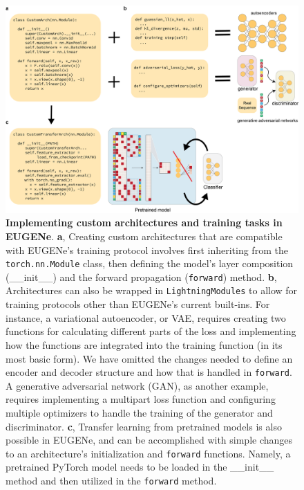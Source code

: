 \begin{figure}[p]
    \centering
    \includegraphics[width=\textwidth]{1_figures-and-files/suppfigure5.png}
    \caption[Custom model development in EUGENe]{\textbf{Implementing custom architectures and training tasks in EUGENe}. \textbf{a}, Creating custom architectures that are compatible with EUGENe’s training protocol involves first inheriting from the \texttt{torch.nn.Module} class, then defining the model’s layer composition (\_\_init\_\_) and the forward propagation (\texttt{forward}) method. \textbf{b}, Architectures can also be wrapped in \texttt{LightningModules} to allow for training protocols other than EUGENe’s current built-ins. For instance, a variational autoencoder, or VAE, requires creating two functions for calculating different parts of the loss and implementing how the functions are integrated into the training function (in its most basic form). We have omitted the changes needed to define an encoder and decoder structure and how that is handled in \texttt{forward}. A generative adversarial network (GAN), as another example, requires implementing a multipart loss function and configuring multiple optimizers to handle the training of the generator and discriminator. \textbf{c}, Transfer learning from pretrained models is also possible in EUGENe, and can be accomplished with simple changes to an architecture’s initialization and \texttt{forward} functions. Namely, a pretrained PyTorch model needs to be loaded in the \_\_init\_\_ method and then utilized in the \texttt{forward} method.}
    \label{fig:supplementary_5}
\end{figure}
